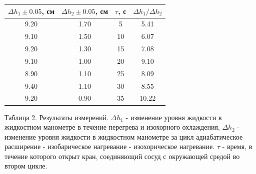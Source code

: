 \begin{tabular}{|c|c|c|c|}
\hline
$\Delta h_1 \pm 0.05$, см & $\Delta h_2 \pm 0.05$, см & $\tau$, с & $\Delta h_1/\Delta h_2$ \\ 
\hline
9.20 & 1.70 & 5  & 5.41  \\
9.10 & 1.50 & 10 & 6.07  \\ 
9.20 & 1.30 & 15 & 7.08  \\
9.10 & 1.00 & 20 & 9.10  \\
8.90 & 1.10 & 25 & 8.09  \\
9.40 & 1.10 & 30 & 8.55  \\
9.20 & 0.90 & 35 & 10.22 \\
\hline
\end{tabular}
\begin{center}
    Таблица 2. Результаты измерений. $\Delta h_1$ - изменение уровня жидкости в жидкостном манометре в течение перегрева и изохорного охлаждения, $\Delta h_2$ - изменение уровня жидкости в жидкостном манометре за цикл адиабатическое расширение - изобарическое нагревание - изохорическое нагревание. $\tau$ - время, в течение которого открыт кран, соединяющий сосуд с окружающей средой во втором цикле.
\end{center}